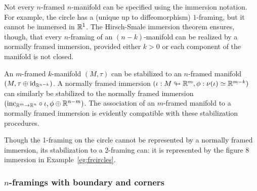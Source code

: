 \documentclass{amsart}
\begin{document}
\begin{remark}
Not every $n$-framed $n$-manifold can be specified using the immersion notation.  For example, the circle has a (unique up to diffeomorphism) $1$-framing, but it cannot be immersed in $\mathbb R^1$.  The Hirsch-Smale immersion theorem \cite{MR0119214, MR0105117} ensures, though, that every $n$-framing of an $(n-k)$-manifold can be realized by a normally framed immersion, provided either $k>0$ or each component of the manifold is not closed.
\end{remark} %

An $m$-framed $k$-manifold $(M,\tau)$ can be stabilized to an $n$-framed manifold $(M,\tau \oplus \mathrm{id}_{\mathbb R^{n-k}})$.  A normally framed immersion $(\iota: M \looparrowright \mathbb R^m, \phi : \nu(\iota) \simeq \mathbb R^{m-k})$ can similarly be stabilized to the normally framed immersion $(\mathrm{inc}_{\mathbb R^m \rightarrow \mathbb R^n} \circ \iota, \phi \oplus \mathbb R^{n-m})$.  The association of an $m$-framed manifold to a normally framed immersion is evidently compatible with these stabilization procedures.

\begin{example}
Though the 1-framing on the circle cannot be represented by a normally framed immersion, its stabilization to a 2-framing can: it is represented by the figure 8 immersion in Example~\ref{eg:frcircles}.
\end{example}


\subsubsection{$n$-framings with boundary and corners}
\end{document}

